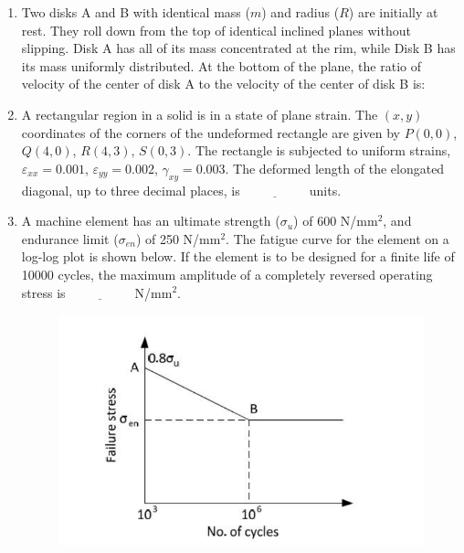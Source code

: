\documentclass[journal]{IEEEtran}
\begin{document}
\begin{enumerate}[leftmargin=0pt]
    \item Two disks A and B with identical mass ($m$) and radius ($R$) are initially at rest. They roll down from the top of identical inclined planes without slipping. Disk A has all of its mass concentrated at the rim, while Disk B has its mass uniformly distributed. At the bottom of the plane, the ratio of velocity of the center of disk A to the velocity of the center of disk B is:
    \hfill{}
    \begin{enumerate}
    \end{enumerate}

    \item A rectangular region in a solid is in a state of plane strain. The $(x,y)$ coordinates of the corners of the undeformed rectangle are given by $P(0,0)$, $Q(4,0)$, $R(4,3)$, $S(0,3)$. The rectangle is subjected to uniform strains, $\varepsilon_{xx} = 0.001$, $\varepsilon_{yy} = 0.002$, $\gamma_{xy} = 0.003$. The deformed length of the elongated diagonal, up to three decimal places, is $\underline{\hspace{2cm}}$ units.
    \hfill{}

    \item A machine element has an ultimate strength ($\sigma_u$) of 600 N/mm$^2$, and endurance limit ($\sigma_{en}$) of 250 N/mm$^2$. The fatigue curve for the element on a log-log plot is shown below. If the element is to be designed for a finite life of 10000 cycles, the maximum amplitude of a completely reversed operating stress is $\underline{\hspace{2cm}}$ N/mm$^2$.
    \hfill{}
    \begin{figure}[h]
    \centering
    \includegraphics[width=0.5\columnwidth]{Figs/image (27).png}
    \caption*{}
    \label{fig:43}
    \end{figure}


\end{enumerate}
\end{document}
